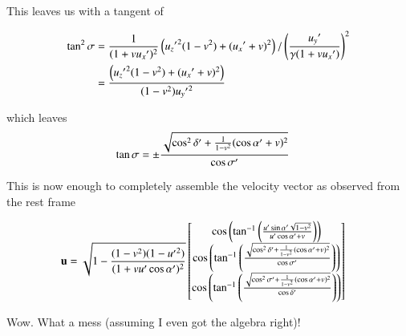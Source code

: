 \documentclass{article}
\begin{document}
This leaves us with a tangent of 

\begin{align*}
\tan^2\sigma
&=
\frac{1}{( 1 + v {u_x}' )^2 } \left(
{{u_z}'}^2(1-v^2)
+ ({u_x}' + v)^2
\right)
/\left(\frac{{u_y}'}{\gamma (1 + v {u_x}')}\right)^2 \\
&=
\frac{ \left(
{{u_z}'}^2(1-v^2)
+ ({u_x}' + v)^2
\right)
}{(1-v^2){{u_y}'}^2}
\end{align*}

which leaves
\begin{align*}
\tan\sigma 
&= \pm \frac{ \sqrt{ \cos^2\delta' + \frac{1}{1-v^2}(\cos\alpha' + v)^2 } }{\cos\sigma'}
\end{align*}

This is now enough to completely assemble the 
velocity vector as observed from the rest frame

\begin{align*}
\mathbf{u} &=
\sqrt{1 -\frac{(1 -v^2 ) (1 -{{u}'}^2)}{( 1 + v u' \cos\alpha' )^2 }}
\begin{bmatrix}
\cos\left(\tan^{-1}\left(\frac{ u' \sin\alpha' \sqrt{1-v^2}}{ u'\cos\alpha' + v  }\right)\right) \\
\cos\left(\tan^{-1}\left(\frac{ \sqrt{ \cos^2\delta' + \frac{1}{1-v^2}(\cos\alpha' + v)^2 } }{\cos\sigma'}\right)\right) \\
\cos\left(\tan^{-1}\left(\frac{ \sqrt{ \cos^2\sigma' + \frac{1}{1-v^2}(\cos\alpha' + v)^2 } }{\cos\delta'}\right)\right)
\end{bmatrix}
\end{align*}

Wow.  What a mess (assuming I even got the algebra right)!



\end{document}
